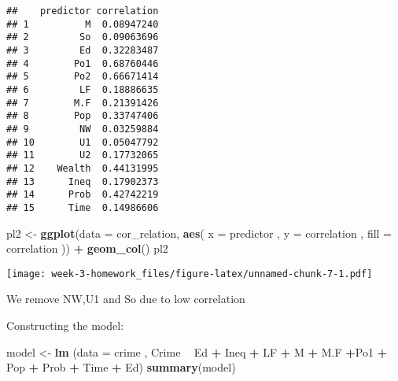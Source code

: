 \documentclass[
]{article}
\newenvironment{Shaded}{\begin{snugshade}}{\end{snugshade}}
\newcommand{\DataTypeTok}[1]{\textcolor[rgb]{0.13,0.29,0.53}{#1}}
\newcommand{\DecValTok}[1]{\textcolor[rgb]{0.00,0.00,0.81}{#1}}
\newcommand{\KeywordTok}[1]{\textcolor[rgb]{0.13,0.29,0.53}{\textbf{#1}}}
\newcommand{\NormalTok}[1]{#1}
\newcommand{\OperatorTok}[1]{\textcolor[rgb]{0.81,0.36,0.00}{\textbf{#1}}}
\newcommand{\StringTok}[1]{\textcolor[rgb]{0.31,0.60,0.02}{#1}}
\begin{document}
\begin{Shaded}
\end{Shaded}

\begin{verbatim}
##    predictor correlation
## 1          M  0.08947240
## 2         So  0.09063696
## 3         Ed  0.32283487
## 4        Po1  0.68760446
## 5        Po2  0.66671414
## 6         LF  0.18886635
## 7        M.F  0.21391426
## 8        Pop  0.33747406
## 9         NW  0.03259884
## 10        U1  0.05047792
## 11        U2  0.17732065
## 12    Wealth  0.44131995
## 13      Ineq  0.17902373
## 14      Prob  0.42742219
## 15      Time  0.14986606
\end{verbatim}

\begin{Shaded}
\begin{Highlighting}[]
\NormalTok{pl2 <-}\StringTok{ }\KeywordTok{ggplot}\NormalTok{(}\DataTypeTok{data =}\NormalTok{ cor_relation, }\KeywordTok{aes}\NormalTok{( }\DataTypeTok{x  =}\NormalTok{ predictor , }\DataTypeTok{y =}\NormalTok{ correlation , }\DataTypeTok{fill =}\NormalTok{ correlation )) }\OperatorTok{+}
\StringTok{  }\KeywordTok{geom_col}\NormalTok{()}
\NormalTok{pl2}
\end{Highlighting}
\end{Shaded}

\texttt{[image: week-3-homework\_files/figure-latex/unnamed-chunk-7-1.pdf]}

We remove NW,U1 and So due to low correlation

Constructing the model:

\begin{Shaded}
\begin{Highlighting}[]
\NormalTok{model <-}\StringTok{ }\KeywordTok{lm}\NormalTok{ (}\DataTypeTok{data =}\NormalTok{ crime , Crime }\OperatorTok{~}\StringTok{ }\NormalTok{Ed }\OperatorTok{+}\StringTok{ }\NormalTok{Ineq }\OperatorTok{+}\StringTok{ }\NormalTok{LF }\OperatorTok{+}\StringTok{ }\NormalTok{M }\OperatorTok{+}\StringTok{ }\NormalTok{M.F }\OperatorTok{+}\NormalTok{Po1 }\OperatorTok{+}\StringTok{ }\NormalTok{Pop }\OperatorTok{+}\StringTok{ }\NormalTok{Prob  }\OperatorTok{+}\StringTok{ }\NormalTok{Time }\OperatorTok{+}\StringTok{ }\NormalTok{Ed)}
\KeywordTok{summary}\NormalTok{(model)}
\end{Highlighting}
\end{Shaded}
\end{document}
